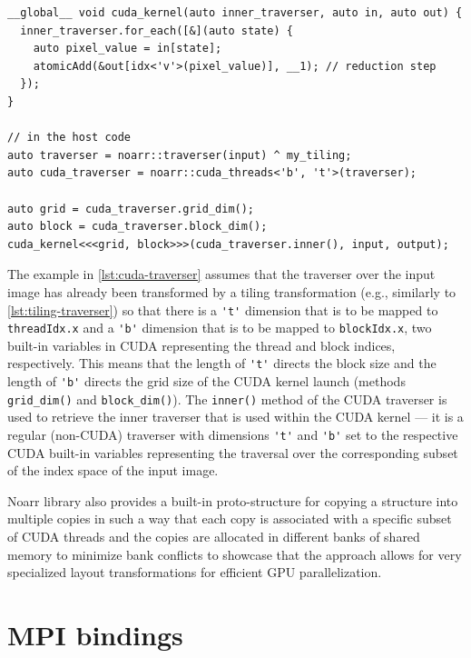 \begin{lstlisting}[style=C++, caption={Binding a Noarr traverser to CUDA grid and block dimensions}, label=lst:cuda-traverser,basicstyle=\ttfamily\scriptsize]
__global__ void cuda_kernel(auto inner_traverser, auto in, auto out) {
  inner_traverser.for_each([&](auto state) {
    auto pixel_value = in[state];
    atomicAdd(&out[idx<'v'>(pixel_value)], __1); // reduction step
  });
}

// in the host code
auto traverser = noarr::traverser(input) ^ my_tiling;
auto cuda_traverser = noarr::cuda_threads<'b', 't'>(traverser);

auto grid = cuda_traverser.grid_dim();
auto block = cuda_traverser.block_dim();
cuda_kernel<<<grid, block>>>(cuda_traverser.inner(), input, output);
\end{lstlisting}

The example in \cref{lst:cuda-traverser} assumes that the traverser over the input image has already been transformed by a tiling transformation (e.g., similarly to \cref{lst:tiling-traverser}) so that there is a \lstinline{'t'} dimension that is to be mapped to \texttt{threadIdx.x} and a \lstinline{'b'} dimension that is to be mapped to \texttt{blockIdx.x}, two built-in variables in CUDA representing the thread and block indices, respectively. This means that the length of \lstinline{'t'} directs the block size and the length of \lstinline{'b'} directs the grid size of the CUDA kernel launch (methods \lstinline{grid_dim()} and \lstinline{block_dim()}). The \lstinline{inner()} method of the CUDA traverser is used to retrieve the inner traverser that is used within the CUDA kernel --- it is a regular (non-CUDA) traverser with dimensions \lstinline{'t'} and \lstinline{'b'} set to the respective CUDA built-in variables representing the traversal over the corresponding subset of the index space of the input image.

Noarr library also provides a built-in proto-structure for copying a structure into multiple copies in such a way that each copy is associated with a specific subset of CUDA threads and the copies are allocated in different banks of shared memory to minimize bank conflicts to showcase that the approach allows for very specialized layout transformations for efficient GPU parallelization.


\section{MPI bindings}\label{sec:mpi-bindings}

